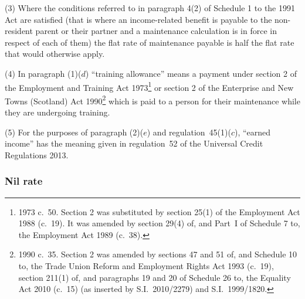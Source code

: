\documentclass[12pt,a4paper]{article}
\begin{document}
(3) Where the conditions referred to in paragraph 4(2) of Schedule 1 to the 1991 Act are satisfied (that is where an income-related benefit is payable to the non-resident parent or their partner and a maintenance calculation is in force in respect of each of them) the flat rate of maintenance payable is half the flat rate that would otherwise apply.

(4) In paragraph (1)($d$)  “training allowance” means a payment under section 2 of the Employment and Training Act 1973\footnote{1973 c.~50. Section 2 was substituted by section 25(1) of the Employment Act 1988 (c.~19). It was amended by section 29(4) of, and Part~I of Schedule 7 to, the Employment Act 1989 (c.~38).} or section 2 of the Enterprise and New Towns (Scotland) Act 1990\footnote{1990 c.~35. Section 2 was amended by sections 47 and 51 of, and Schedule 10 to, the Trade Union Reform and Employment Rights Act 1993 (c.~19), section 211(1) of, and paragraphs 19 and 20 of Schedule 26 to, the Equality Act 2010 (c.~15) (as inserted by S.I.~2010/2279) and S.I.~1999/1820.} which is paid to a person for their maintenance while they are undergoing training.

(5) For the purposes of paragraph (2)($e$)  and regulation~45(1)($c$), “earned income” has the meaning given in regulation~52 of the Universal Credit Regulations 2013.


\subsubsection[45. Nil rate]{Nil rate}
\end{document}
